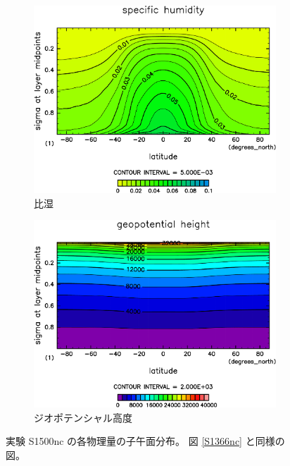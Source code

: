 \documentclass[body]{subfiles}
\begin{document}
\begin{figure}[t]
\begin{subfigure}{.4\textwidth}
		\includegraphics[width=\columnwidth]{S1500-nc/QH2OVap,time=3650:4015-crop-rotate.pdf}
		\caption{比湿\hmu*{[kg/kg]}}\label{S1500nc比湿}
	\end{subfigure}
	\begin{subfigure}{.4\textwidth}
		\centering
		\includegraphics[width=\columnwidth]{S1500-nc/Height,time=3650:4015-crop-rotate.pdf}
		\caption{ジオポテンシャル高度\hmu*{[m/s]}}\label{S1500ncジオポテンシャル高度}
	\end{subfigure}
	\caption[実験 S1500nc の各物理量の子午面分布]{
		実験 S1500nc の各物理量の子午面分布。
		図 \ref{S1366nc} と同様の図。
	}\label{S1500nc}
\end{figure}
\end{document}
